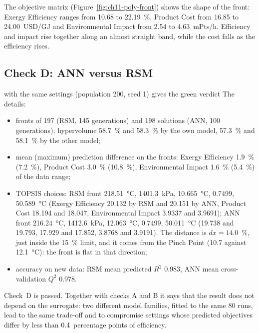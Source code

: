 The objective matrix (Figure~\ref{fig:ch11-poly-front}) shows the shape of the front: Exergy Efficiency ranges from
10.68 to 22.19~\%, Product Cost from 16.85 to 24.00~USD/GJ and Environmental Impact from 2.54 to 4.63~mPts/h.
Efficiency and impact rise together along an almost straight band, while the cost falls as the efficiency rises.

\subsection{Check D: ANN versus RSM}
 with the same settings (population 200, seed 1) gives the green verdict  The details:
\begin{itemize}
  \item fronts of 197 (RSM, 145 generations) and 198 solutions (ANN, 100 generations); hypervolume 58.7~\% and
        58.3~\% by the own model, 57.3~\% and 58.1~\% by the other model;
  \item mean (maximum) prediction difference on the fronts: Exergy Efficiency 1.9~\% (7.2~\%), Product Cost 3.0~\%
        (10.8~\%), Environmental Impact 1.6~\% (5.4~\%) of the data range;
  \item TOPSIS choices: RSM front 218.51~°C, 1401.3~kPa, 10.665~°C, 0.7499, 50.589~°C (Exergy Efficiency 20.132 by RSM
        and 20.151 by ANN, Product Cost 18.194 and 18.047, Environmental Impact 3.9337 and 3.9691); ANN front
        216.24~°C, 1412.6~kPa, 12.063~°C, 0.7499, 50.011~°C (19.738 and 19.793, 17.929 and 17.852, 3.8768 and
        3.9191). The distance is $dx=14.0$~\%, just inside the 15~\% limit, and it comes from the Pinch Point (10.7
        against 12.1~°C): the front is flat in that direction;
  \item accuracy on new data: RSM mean predicted $R^2$ 0.983, ANN mean cross-validation $Q^2$ 0.978.
\end{itemize}
Check~D is passed. Together with checks A and B it says that the result does not depend on the surrogate: two
different model families, fitted to the same 80 runs, lead to the same trade-off and to compromise settings whose
predicted objectives differ by less than 0.4~percentage points of efficiency.

